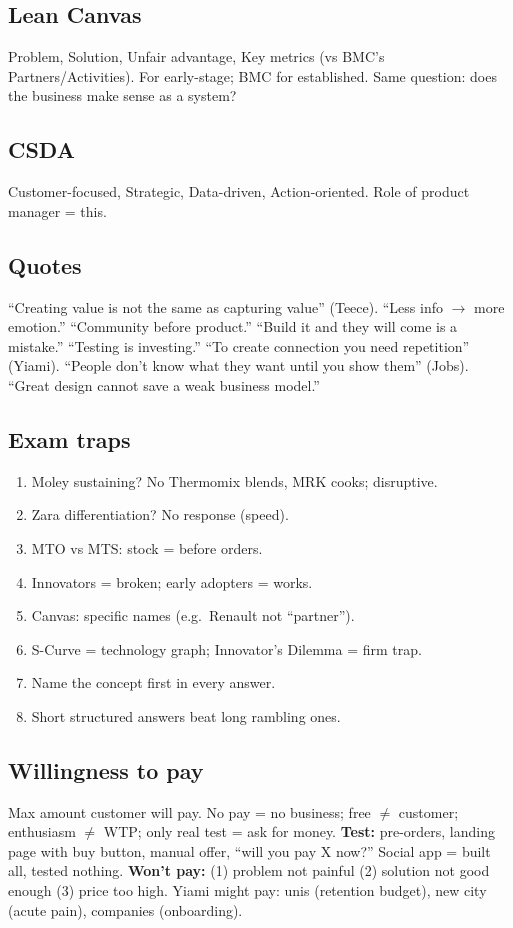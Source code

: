 \documentclass[8pt,a4paper]{article}
\begin{document}
\subsection*{Lean Canvas}
Problem, Solution, Unfair advantage, Key metrics (vs BMC's Partners/Activities). For early-stage; BMC for established. Same question: does the business make sense as a system?

\subsection*{CSDA}
Customer-focused, Strategic, Data-driven, Action-oriented. Role of product manager = this.

\subsection*{Quotes}
``Creating value is not the same as capturing value'' (Teece). ``Less info $\to$ more emotion.'' ``Community before product.'' ``Build it and they will come is a mistake.'' ``Testing is investing.'' ``To create connection you need repetition'' (Yiami). ``People don't know what they want until you show them'' (Jobs). ``Great design cannot save a weak business model.''

\subsection*{Exam traps}
\begin{enumerate}
\item Moley sustaining? No Thermomix blends, MRK cooks; disruptive.
\item Zara differentiation? No response (speed).
\item MTO vs MTS: stock = before orders.
\item Innovators = broken; early adopters = works.
\item Canvas: specific names (e.g.\ Renault not ``partner'').
\item S-Curve = technology graph; Innovator's Dilemma = firm trap.
\item Name the concept first in every answer.
\item Short structured answers beat long rambling ones.
\end{enumerate}

\subsection*{Willingness to pay}
Max amount customer will pay. No pay = no business; free $\neq$ customer; enthusiasm $\neq$ WTP; only real test = ask for money. \textbf{Test:} pre-orders, landing page with buy button, manual offer, ``will you pay X now?'' Social app = built all, tested nothing. \textbf{Won't pay:} (1) problem not painful (2) solution not good enough (3) price too high. Yiami might pay: unis (retention budget), new city (acute pain), companies (onboarding).
\end{document}
